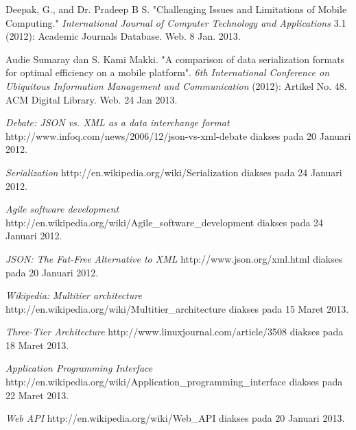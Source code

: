 \documentclass[a4paper, 12pt, oneside]{report}
\begin{document}
\begin{thebibliography}{99}
\singlespacing 


Deepak, G., and Dr. Pradeep B S. "Challenging Issues and Limitations of Mobile Computing."
  \emph{International Journal of Computer Technology and Applications} 3.1 (2012): Academic Journals Database. Web. 8 Jan. 2013.
  
Audie Sumaray dan S. Kami Makki. "A comparison of data serialization formats for optimal efficiency on a mobile platform". \emph{6th International Conference on Ubiquitous Information Management and Communication} (2012): Artikel No. 48. ACM Digital Library. Web. 24 Jan 2013.
  
  \emph{Debate: JSON vs. XML as a data interchange format}
  http://www.infoq.com/news/2006/12/json-vs-xml-debate
  diakses pada 20 Januari 2012.
  
  \emph{Serialization}
  http://en.wikipedia.org/wiki/Serialization
  diakses pada 24 Januari 2012.
  
  \emph{Agile software development}
  http://en.wikipedia.org/wiki/Agile\_software\_development
  diakses pada 24 Januari 2012.
  
  \emph{JSON: The Fat-Free Alternative to XML}
  http://www.json.org/xml.html
  diakses pada 20 Januari 2012.
  
  \emph{Wikipedia: Multitier architecture}
  http://en.wikipedia.org/wiki/Multitier\_architecture
  diakses pada 15 Maret 2013.
  
  \emph{Three-Tier Architecture}
  http://www.linuxjournal.com/article/3508
  diakses pada 18 Maret 2013.
  
  \emph{Application Programming Interface}
  http://en.wikipedia.org/wiki/Application\_programming\_interface
  diakses pada 22 Maret 2013.
  
  \emph{Web API}
  http://en.wikipedia.org/wiki/Web\_API
  diakses pada 20 Januari 2013.
  

\end{thebibliography}
\end{document}
